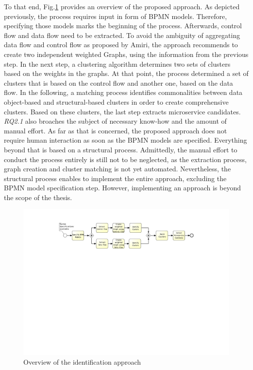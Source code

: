 \endgroup
\vspace{0.5cm}



\noindent
To that end, Fig.\ref{fig:thesisProcess} provides an overview of the proposed approach. As depicted previously, the process requires input in form of BPMN models. Therefore, specifying those models marks the beginning of the process. Afterwards, control flow and data flow need to be extracted. To avoid the ambiguity of aggregating data flow and control flow as proposed by Amiri, the approach recommends to create two independent weighted Graphs, using the information from the previous step. In the next step, a clustering algorithm determines two sets of clusters based on the weights in the graphs. At that point, the process determined a set of clusters that is based on the control flow and another one, based on the data flow. In the following, a matching process identifies commonalities between data object-based and structural-based clusters in order to create comprehensive clusters. Based on these clusters, the last step extracts microservice candidates. \\

\textit{RQ2.1} also broaches the subject of necessary know-how and the amount of manual effort. As far as that is concerned, the proposed approach does not require human interaction as soon as the BPMN models are specified. Everything beyond that is based on a structural process.
Admittedly, the manual effort to conduct the process entirely is still not to be neglected, as the extraction process, graph creation and cluster matching is not yet automated. Nevertheless, the structural process enables to implement the entire approach, excluding the BPMN model specification step. However, implementing an approach is beyond the scope of the thesis.




 
\begin{figure}[h!]
	\includegraphics[width=\textwidth, trim={7.5cm 15.3cm 5.0cm 1.5cm}]{img/ThesisProcess.pdf}
	\caption{Overview of the identification approach}
	\label{fig:thesisProcess}
\end{figure}






